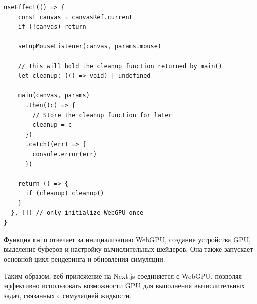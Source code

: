 \begin{lstlisting}[language=ES6,caption=Часть React-компонента для инициализации WebGPU]
useEffect(() => {
    const canvas = canvasRef.current
    if (!canvas) return

    setupMouseListener(canvas, params.mouse)

    // This will hold the cleanup function returned by main()
    let cleanup: (() => void) | undefined

    main(canvas, params)
      .then((c) => {
        // Store the cleanup function for later
        cleanup = c
      })
      .catch((err) => {
        console.error(err)
      })

    return () => {
      if (cleanup) cleanup()
    }
  }, []) // only initialize WebGPU once
}
\end{lstlisting}

Функция \texttt{main} отвечает за инициализацию WebGPU, создание устройства GPU, выделение буферов и настройку вычислительных шейдеров. Она также запускает основной цикл рендеринга и обновления симуляции.

Таким образом, веб-приложение на Next.js соединяется с WebGPU, позволяя эффективно использовать возможности GPU для выполнения вычислительных задач, связанных с симуляцией жидкости.